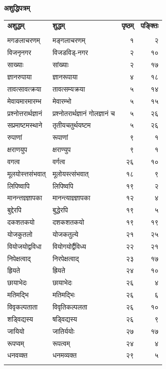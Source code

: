 \documentclass[11pt, openany]{book}
\begin{document}
\thispagestyle{empty}
\newpage
\pagestyle{empty}
\begin{center}
    \textbf{\LARGE अशुद्धिपत्रम्}
\end{center}
{\onehalfspacing\s
\begin{longtable}{llrr}
\textbf{\large अशुद्धम्}& \textbf{\large शुद्धम्}&\textbf{\large पृष्ठम्}&\textbf{\large पङ्क्तिः}\\
&&&\\
\endhead
मगङलाचरणम् &मङ्गलाचरणम् &१& २\\
विजनृनगर &विजडविड्-नगर &२ &१०\\
साख्याः& सांख्याः &२& १७\\
ज्ञानरुपाया &ज्ञानरूपाया& ४& १८\\
तावत्सावत्क्रया &तावत्सम्यक्रया& ५ &१४\\
मेवायमारमारम्भ &मेवारम्भो &५& १५\\
प्रश्नोत्तरार्थज्ञानं &प्रश्नोतरार्थज्ञानं गोलज्ञानं च& ५& २६\\
सप्रमाष्टमस्थाने &तृतीयचतुर्थयष्टम &५& २६\\
रुपाणां& रूपाणां &९& १\\
क्षराणयुप& क्षराण्युप &९& १\\
वगत्व& वर्गत्व &२६& १०\\
मूलयोस्त्तसंभवात्& मूलोयस्त्संभवात्& १८& ९\\
लिपिष्वापि& लिपिष्वपि& १९& २\\
मानन्त्तज्ञ्ज्ञापका& मानन्त्याज्ञ्ज्ञापका &१२& ४\\
बुद्देरपि &बुद्धेरपि &१९& ५\\
दकशतकयो &दशकशतकयो &१९& १९\\
योजकुतलो &योजकतुल्ये &२१& २५\\
वियोजयोद्वविधा &वियोगयोर्द्वैविध्य &२२& २१\\
निपेक्षत्वाद् &निरपेक्षत्वाद् &२३& १७\\
हृियते &ह्रियते &२४& १०\\
छायाभेदः& छायाभेदः &२६& ४\\
मतिमद्भि &मतिमद्भिः &२६& ६\\
विवृकल्पताता& विवृतिकल्पलता& २६& १०\\
शड्विद्यस्य& षड्विद्यस्य &२६& ९\\
जायियो &जातिर्ययोः &२७& १७\\
रूपप्वम् &रूपत्वम् &२४& ४\\
धनवव्क्त& धनमव्यक्त& २९& ५\\

\newpage


\end{longtable}}
\end{document}
